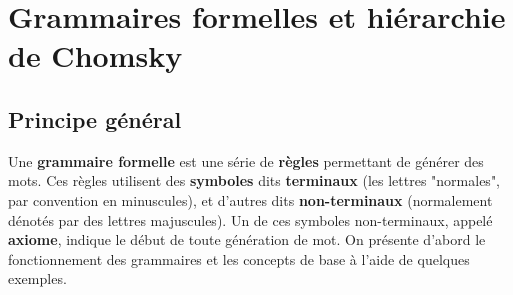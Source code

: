 \chapter{Grammaires formelles et hiérarchie de Chomsky}
\label{grammaires}


\section{Principe général}

Une \textbf{grammaire formelle} est une série de \textbf{règles} permettant de générer des mots. Ces règles utilisent des \textbf{symboles} dits \textbf{terminaux} (les lettres "normales", par convention en minuscules), et d'autres dits \textbf{non-terminaux} (normalement dénotés par des lettres majuscules). Un de ces symboles non-terminaux, appelé \textbf{axiome}, indique le début de toute génération de mot. On présente d'abord le fonctionnement des grammaires et les concepts de base à l'aide de quelques exemples. 

